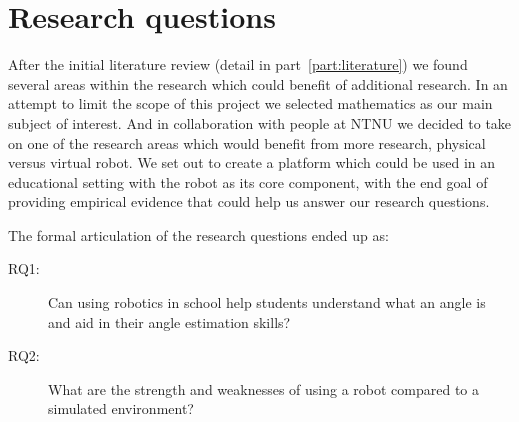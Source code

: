 \chapter{Research questions}
After the initial literature review (detail in part~\ref{part:literature}) we found several areas within the research which could benefit of additional research. 
In an attempt to limit the scope of this project we selected mathematics as our main subject of interest. And in collaboration with people at NTNU we decided to take on one of the research areas which would benefit from more research, physical versus virtual robot. 
We set out to create a platform which could be used in an educational setting with the \chirp robot as its core component, with the end goal of providing empirical evidence that could help us answer our research questions. 

\bigskip\noindent
The formal articulation of the research questions ended up as:
\begin{description}
	\item[RQ1: ] Can using robotics in school help students understand what an angle is and aid in their angle estimation skills?
	\item[RQ2: ] What are the strength and weaknesses of using a robot compared to a simulated environment?
\end{description}
